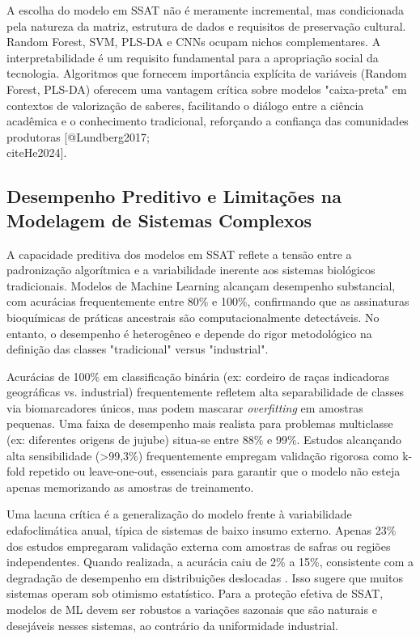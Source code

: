 A escolha do modelo em SSAT não é meramente incremental, mas condicionada pela natureza da matriz, estrutura de dados e requisitos de preservação cultural. Random Forest, SVM, PLS-DA e CNNs ocupam nichos complementares. A interpretabilidade é um requisito fundamental para a apropriação social da tecnologia. Algoritmos que fornecem importância explícita de variáveis (Random Forest, PLS-DA) oferecem uma vantagem crítica sobre modelos "caixa-preta" em contextos de valorização de saberes, facilitando o diálogo entre a ciência acadêmica e o conhecimento tradicional, reforçando a confiança das comunidades produtoras [@Lundberg2017;  \\cite{He2024}].



\subsection{Desempenho Preditivo e Limitações na Modelagem de Sistemas Complexos}

A capacidade preditiva dos modelos em SSAT reflete a tensão entre a padronização algorítmica e a variabilidade inerente aos sistemas biológicos tradicionais. Modelos de Machine Learning alcançam desempenho substancial, com acurácias frequentemente entre 80\% e 100\%, confirmando que as assinaturas bioquímicas de práticas ancestrais são computacionalmente detectáveis. No entanto, o desempenho é heterogêneo e depende do rigor metodológico na definição das classes "tradicional" versus "industrial".

Acurácias de 100\% em classificação binária (ex: cordeiro de raças indicadoras geográficas vs. industrial) frequentemente refletem alta separabilidade de classes via biomarcadores únicos, mas podem mascarar \emph{overfitting} em amostras pequenas. Uma faixa de desempenho mais realista para problemas multiclasse (ex: diferentes origens de jujube) situa-se entre 88\% e 99\%. Estudos alcançando alta sensibilidade (>99,3\%) frequentemente empregam validação rigorosa como k-fold repetido ou leave-one-out, essenciais para garantir que o modelo não esteja apenas memorizando as amostras de treinamento.

Uma lacuna crítica é a generalização do modelo frente à variabilidade edafoclimática anual, típica de sistemas de baixo insumo externo. Apenas 23\% dos estudos empregaram validação externa com amostras de safras ou regiões independentes. Quando realizada, a acurácia caiu de 2\% a 15\%, consistente com a degradação de desempenho em distribuições deslocadas  \cite{Kuhn2013}. Isso sugere que muitos sistemas operam sob otimismo estatístico. Para a proteção efetiva de SSAT, modelos de ML devem ser robustos a variações sazonais que são naturais e desejáveis nesses sistemas, ao contrário da uniformidade industrial.

